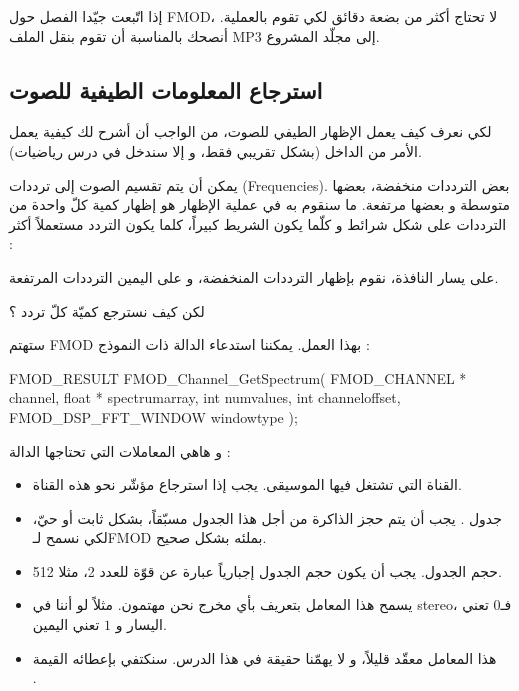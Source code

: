 إذا اتّبعت جيّدا الفصل حول
\textenglish{FMOD}،
لا تحتاج أكثر من بضعة دقائق لكي تقوم بالعملية. أنصحك بالمناسبة أن تقوم بنقل الملف
\textenglish{MP3}
إلى مجلّد المشروع.

\subsection{استرجاع المعلومات الطيفية للصوت}

لكي نعرف كيف يعمل الإظهار الطيفي للصوت، من الواجب أن أشرح لك كيفية يعمل الأمر من الداخل (بشكل تقريبي فقط، و إلا سندخل في درس رياضيات).

يمكن أن يتم تقسيم الصوت إلى ترددات 
(\textenglish{Frequencies}).
بعض الترددات منخفضة، بعضها متوسطة و بعضها مرتفعة. ما سنقوم به في عملية الإظهار هو إظهار كمية كلّ واحدة من الترددات على شكل شرائط و كلّما يكون الشريط كبيراً، كلما يكون التردد مستعملاً أكثر :


على يسار النافذة، نقوم بإظهار الترددات المنخفضة، و على اليمين الترددات المرتفعة.

\begin{question}
لكن كيف نسترجع كميّة كلّ تردد ؟
\end{question}

ستهتم
\textenglish{FMOD}
بهذا العمل. يمكننا استدعاء الدالة
ذات النموذج :

\begin{Csource}
FMOD_RESULT FMOD_Channel_GetSpectrum(
	FMOD_CHANNEL *  channel,
	float *  spectrumarray,
	int  numvalues,
	int  channeloffset,
	FMOD_DSP_FFT_WINDOW  windowtype
);
\end{Csource}

و هاهي المعاملات التي تحتاجها الدالة :

\begin{itemize}
	\item القناة التي تشتغل فيها الموسيقى. يجب إذا استرجاع مؤشّر نحو هذه القناة.
	\item جدول
	.
	يجب أن يتم حجز الذاكرة من أجل هذا الجدول مسبّقاً، بشكل ثابت أو حيّ، لكي نسمح لـ\textenglish{FMOD}
	بملئه بشكل صحيح.
	\item حجم الجدول. يجب أن يكون حجم الجدول إجبارياً عبارة عن قوّة للعدد 2، مثلا 512.
	\item يسمح هذا المعامل بتعريف بأي مخرج نحن مهتمون. مثلاً لو أننا في
	\textenglish{stereo}،
	فـ$ 0 $ تعني اليسار و $ 1 $ تعني اليمين.
	\item هذا المعامل معقّد قليلاً، و لا يهمّنا حقيقة في هذا الدرس. سنكتفي بإعطائه القيمة\\ 
	.
\end{itemize}

